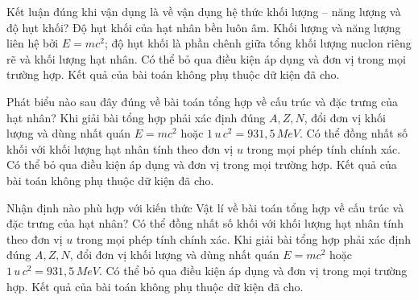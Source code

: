 \begin{ex}
Kết luận đúng khi vận dụng là về vận dụng hệ thức khối lượng – năng lượng và độ hụt khối?
\choice
{Độ hụt khối của hạt nhân bền luôn âm.}
{\True Khối lượng và năng lượng liên hệ bởi $E=mc^2$; độ hụt khối là phần chênh giữa tổng khối lượng nuclon riêng rẽ và khối lượng hạt nhân.}
{Có thể bỏ qua điều kiện áp dụng và đơn vị trong mọi trường hợp.}
{Kết quả của bài toán không phụ thuộc dữ kiện đã cho.}
\end{ex}

\begin{ex}
Phát biểu nào sau đây đúng về bài toán tổng hợp về cấu trúc và đặc trưng của hạt nhân?
\choice
{\True Khi giải bài tổng hợp phải xác định đúng $A,Z,N$, đổi đơn vị khối lượng và dùng nhất quán $E=mc^2$ hoặc $1\,u\,c^2=931,5\,MeV$.}
{Có thể đồng nhất số khối với khối lượng hạt nhân tính theo đơn vị $u$ trong mọi phép tính chính xác.}
{Có thể bỏ qua điều kiện áp dụng và đơn vị trong mọi trường hợp.}
{Kết quả của bài toán không phụ thuộc dữ kiện đã cho.}
\end{ex}

\begin{ex}
Nhận định nào phù hợp với kiến thức Vật lí về bài toán tổng hợp về cấu trúc và đặc trưng của hạt nhân?
\choice
{Có thể đồng nhất số khối với khối lượng hạt nhân tính theo đơn vị $u$ trong mọi phép tính chính xác.}
{\True Khi giải bài tổng hợp phải xác định đúng $A,Z,N$, đổi đơn vị khối lượng và dùng nhất quán $E=mc^2$ hoặc $1\,u\,c^2=931,5\,MeV$.}
{Có thể bỏ qua điều kiện áp dụng và đơn vị trong mọi trường hợp.}
{Kết quả của bài toán không phụ thuộc dữ kiện đã cho.}
\end{ex}

